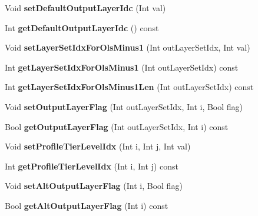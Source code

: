 \begin{DoxyCompactItemize}
Void {\bfseries set\+Default\+Output\+Layer\+Idc} (Int val)
\item 
\mbox{\label{class_t_com_v_p_s_a415ca5b72b0bfa65db487e980fcc6b87}} 
Int {\bfseries get\+Default\+Output\+Layer\+Idc} () const
\item 
\mbox{\label{class_t_com_v_p_s_ac40510509b111fe6df043bae0ec150aa}} 
Void {\bfseries set\+Layer\+Set\+Idx\+For\+Ols\+Minus1} (Int out\+Layer\+Set\+Idx, Int val)
\item 
\mbox{\label{class_t_com_v_p_s_a51ebd72c0cbe1fee6b83019161807928}} 
Int {\bfseries get\+Layer\+Set\+Idx\+For\+Ols\+Minus1} (Int out\+Layer\+Set\+Idx) const
\item 
\mbox{\label{class_t_com_v_p_s_a419f7e5c8bcde65c08caf17cf0868784}} 
Int {\bfseries get\+Layer\+Set\+Idx\+For\+Ols\+Minus1\+Len} (Int out\+Layer\+Set\+Idx) const
\item 
\mbox{\label{class_t_com_v_p_s_a4d29d9cb94c9a2f095129c2318decf02}} 
Void {\bfseries set\+Output\+Layer\+Flag} (Int out\+Layer\+Set\+Idx, Int i, Bool flag)
\item 
\mbox{\label{class_t_com_v_p_s_a84bc3b60cc57d86a6db9edd90e805463}} 
Bool {\bfseries get\+Output\+Layer\+Flag} (Int out\+Layer\+Set\+Idx, Int i) const
\item 
\mbox{\label{class_t_com_v_p_s_aad03418871e9ec1a2c4948d822156ed2}} 
Void {\bfseries set\+Profile\+Tier\+Level\+Idx} (Int i, Int j, Int val)
\item 
\mbox{\label{class_t_com_v_p_s_af97e5e9da6ca2ce57f64825cbba29087}} 
Int {\bfseries get\+Profile\+Tier\+Level\+Idx} (Int i, Int j) const
\item 
\mbox{\label{class_t_com_v_p_s_ae92c5658488beb9c36255c50330bad00}} 
Void {\bfseries set\+Alt\+Output\+Layer\+Flag} (Int i, Bool flag)
\item 
\mbox{\label{class_t_com_v_p_s_a030dfffa6686c36f4cb6d11879684608}} 
Bool {\bfseries get\+Alt\+Output\+Layer\+Flag} (Int i) const

\end{DoxyCompactItemize}
